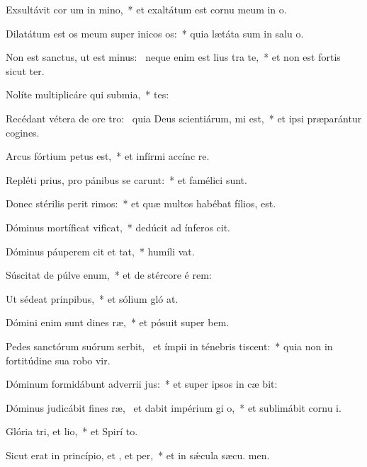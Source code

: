 \item Exsultávit cor um in mino,~* et exaltátum est cornu meum in  o.
\item Dilatátum est os meum super inicos os:~* quia lætáta sum in salu o.
\item Non est sanctus, ut est minus:~\pscross{} neque enim est lius tra te,~* et non est fortis sicut  ter.
\item Nolíte multiplicáre qui submia,~* tes:
\item Recédant vétera de ore tro:~\pscross{} quia Deus scientiárum, mi est,~* et ipsi præparántur cogines.
\item Arcus fórtium petus est,~* et infírmi accínc  re.
\item Repléti prius, pro pánibus se carunt:~* et famélici  sunt.
\item Donec stérilis perit rimos:~* et quæ multos habébat fílios,  est.
\item Dóminus mortíficat  vificat,~* dedúcit ad ínferos  cit.
\item Dóminus páuperem cit et tat,~* humíli  vat.
\item Súscitat de púlve enum,~* et de stércore é rem:
\item Ut sédeat  prinpibus,~* et sólium gló at.
\item Dómini enim sunt dines ræ,~* et pósuit super  bem.
\item Pedes sanctórum suórum serbit,~\pscross{} et ímpii in ténebris tiscent:~* quia non in fortitúdine sua robo vir.
\item Dóminum formidábunt adverrii jus:~* et super ipsos in cæ bit:
\item Dóminus judicábit fines ræ,~\pscross{} et dabit impérium gi o,~* et sublimábit cornu  i.
\item Glória tri, et lio,~* et Spirí to.
\item Sicut erat in princípio, et , et per,~* et in sǽcula sæcu. men.
